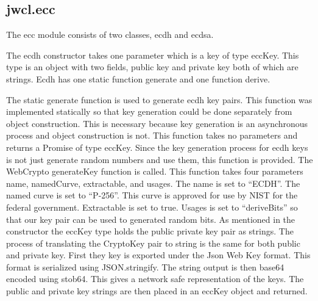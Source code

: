 \subsection{jwcl.ecc}


The ecc module consists of two classes, ecdh and ecdsa. 


The ecdh constructor takes one parameter which is a key of type eccKey. This type is an object with two fields, public key and private key both of which are strings. Ecdh has one static function generate and one function derive. 


The static generate function is used to generate ecdh key pairs. This function was implemented statically so that key generation could be done separately from object construction. This is necessary because key generation is an asynchronous process and object construction is not. This function takes no parameters and returns a Promise of type eccKey. Since the key generation process for ecdh keys is not just generate random numbers and use them, this function is provided. The WebCrypto generateKey function is called. This function takes four parameters name, namedCurve, extractable, and usages. The name is set to “ECDH”. The named curve is set to “P-256”. This curve is approved for use by NIST for the federal government. \cite{nist-curves}
Extractable is set to true. Usages is set to “deriveBits” so that our key pair can be used to generated random bits. As mentioned in the constructor the eccKey type holds the public private key pair as strings. The process of translating the CryptoKey pair to string is the same for both public and private key. First they key is exported under the Json Web Key format. This format is serialized using JSON.stringify. The string output is then base64 encoded using stob64. This gives a network safe representation of the keys. The public and private key strings are then placed in an eccKey object and returned.


